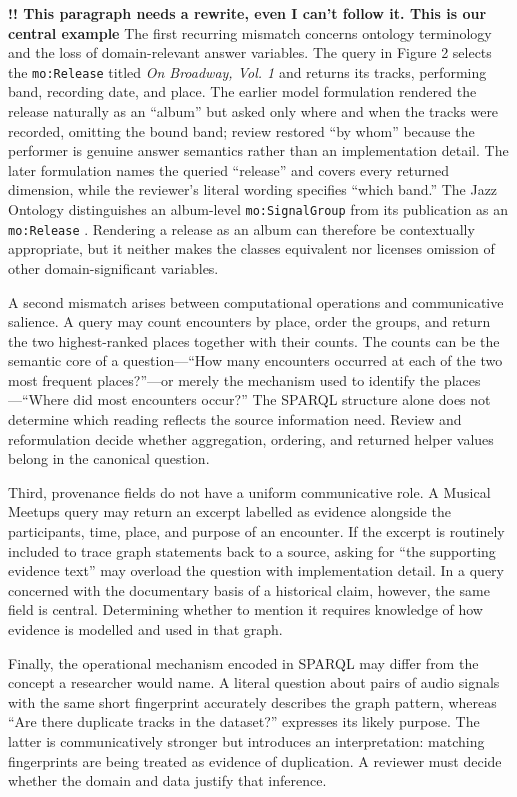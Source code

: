 \textbf{!! This paragraph needs a rewrite, even I can't follow it. This is our central example} The first recurring mismatch concerns ontology terminology and the loss of domain-relevant answer variables. The query in Figure 2 selects the \texttt{mo:Release} titled \emph{On Broadway, Vol. 1} and returns its tracks, performing band, recording date, and place. The earlier model formulation rendered the release naturally as an ``album'' but asked only where and when the tracks were recorded, omitting the bound band; review restored ``by whom'' because the performer is genuine answer semantics rather than an implementation detail. The later formulation names the queried ``release'' and covers every returned dimension, while the reviewer's literal wording specifies ``which band.'' The Jazz Ontology distinguishes an album-level \texttt{mo:SignalGroup} from its publication as an \texttt{mo:Release} \citep{proutskova2022jazz}. Rendering a release as an album can therefore be contextually appropriate, but it neither makes the classes equivalent nor licenses omission of other domain-significant variables.

A second mismatch arises between computational operations and communicative salience. A query may count encounters by place, order the groups, and return the two highest-ranked places together with their counts. The counts can be the semantic core of a question---``How many encounters occurred at each of the two most frequent places?''---or merely the mechanism used to identify the places---``Where did most encounters occur?'' The SPARQL structure alone does not determine which reading reflects the source information need. Review and reformulation decide whether aggregation, ordering, and returned helper values belong in the canonical question.

Third, provenance fields do not have a uniform communicative role. A Musical Meetups query may return an excerpt labelled as evidence alongside the participants, time, place, and purpose of an encounter. If the excerpt is routinely included to trace graph statements back to a source, asking for ``the supporting evidence text'' may overload the question with implementation detail. In a query concerned with the documentary basis of a historical claim, however, the same field is central. Determining whether to mention it requires knowledge of how evidence is modelled and used in that graph.

Finally, the operational mechanism encoded in SPARQL may differ from the concept a researcher would name. A literal question about pairs of audio signals with the same short fingerprint accurately describes the graph pattern, whereas ``Are there duplicate tracks in the dataset?'' expresses its likely purpose. The latter is communicatively stronger but introduces an interpretation: matching fingerprints are being treated as evidence of duplication. A reviewer must decide whether the domain and data justify that inference.

